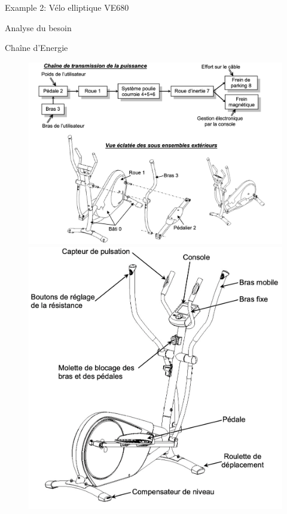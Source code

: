 \documentclass[
  ignorenonframetext,
  aspectratio=169,
  c]{beamer}
\begin{document}
\begin{frame}{Example 2: Vélo elliptique VE680}
\begin{block}{Analyse du besoin}
\begin{figure}
\end{figure}%
\end{block}

\begin{block}{Chaîne d'Energie}
\begin{figure}

\begin{minipage}{0.55\linewidth}
\begin{center}
\includegraphics[width=1\textwidth,height=\textheight]{CM3/Velo-fonctionnelle-04.png}
\end{center}
\end{minipage}%
%
\begin{minipage}{0.46\linewidth}
\begin{center}
\includegraphics[width=1\textwidth,height=\textheight]{CM3/Velo-fonctionnelle-02.png}
\end{center}
\end{minipage}%


\end{figure}
\end{block}
\end{frame}
\end{document}
